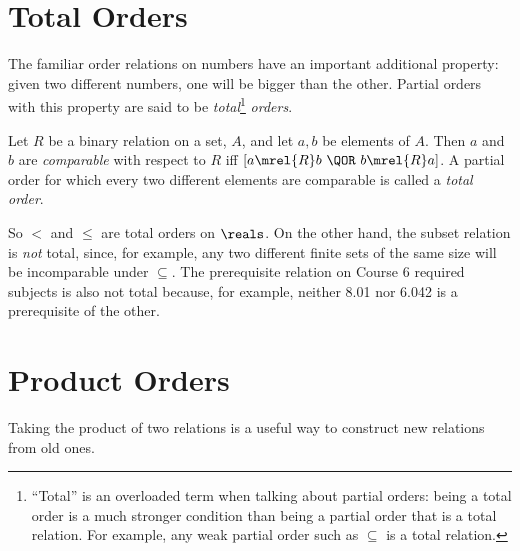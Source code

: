 \section{Total Orders}

The familiar order relations on numbers have an important additional
property: given two different numbers, one will be bigger than the other.
Partial orders with this property are said to be
\emph{total}\footnote{``Total'' is an overloaded term when talking about
  partial orders: being a total order is a much stronger condition than
  being a partial order that is a total relation.  For example, any weak
  partial order such as $\subseteq$ is a total relation.} \emph{orders}.

\begin{definition}
Let $R$ be a binary relation on a set, $A$, and let $a, b$ be elements of
$A$.  Then $a$ and $b$ are \emph{comparable} with respect to $R$ iff $[a
  \mrel{R} b\ \QOR\ b \mrel{R} a]$.  A partial order for which every two
different elements are comparable is called a \emph{total order}.
\end{definition}

So $<$ and $\le$ are total orders on $\reals$.  On the other hand, the
subset relation is \emph{not} total, since, for example, any two different
finite sets of the same size will be incomparable under $\subseteq$.  The
prerequisite relation on Course 6 required subjects is also not total
because, for example, neither 8.01 nor 6.042 is a prerequisite of the
other.

\begin{problems}
\practiceproblems
{}

\classproblems
{}

\homeworkproblems
{}

\examproblems
{}

\end{problems}


\section{Product Orders}\label{prodsec}

Taking the product of two relations is a useful way to construct new
relations from old ones.

